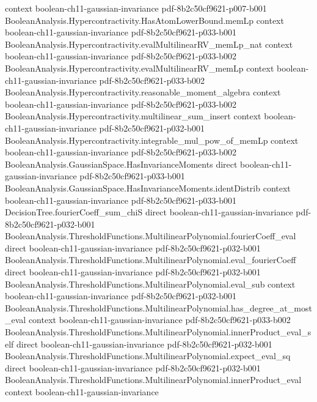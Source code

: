 \begin{theorem}
  {context}
  {boolean-ch11-gaussian-invariance}
  {pdf-8b2c50cf9621-p007-b001}
\proofstep
  {BooleanAnalysis.Hypercontractivity.HasAtomLowerBound.memLp}
  {context}
  {boolean-ch11-gaussian-invariance}
  {pdf-8b2c50cf9621-p033-b001}
\proofstep
  {BooleanAnalysis.Hypercontractivity.evalMultilinearRV_memLp_nat}
  {context}
  {boolean-ch11-gaussian-invariance}
  {pdf-8b2c50cf9621-p033-b002}
\proofstep
  {BooleanAnalysis.Hypercontractivity.evalMultilinearRV_memLp}
  {context}
  {boolean-ch11-gaussian-invariance}
  {pdf-8b2c50cf9621-p033-b002}
\proofstep
  {BooleanAnalysis.Hypercontractivity.reasonable_moment_algebra}
  {context}
  {boolean-ch11-gaussian-invariance}
  {pdf-8b2c50cf9621-p033-b002}
\proofstep
  {BooleanAnalysis.Hypercontractivity.multilinear_sum_insert}
  {context}
  {boolean-ch11-gaussian-invariance}
  {pdf-8b2c50cf9621-p032-b001}
\proofstep
  {BooleanAnalysis.Hypercontractivity.integrable_mul_pow_of_memLp}
  {context}
  {boolean-ch11-gaussian-invariance}
  {pdf-8b2c50cf9621-p033-b002}
\proofstep
  {BooleanAnalysis.GaussianSpace.HasInvarianceMoments}
  {direct}
  {boolean-ch11-gaussian-invariance}
  {pdf-8b2c50cf9621-p033-b001}
\proofstep
  {BooleanAnalysis.GaussianSpace.HasInvarianceMoments.identDistrib}
  {context}
  {boolean-ch11-gaussian-invariance}
  {pdf-8b2c50cf9621-p033-b001}
\proofstep
  {DecisionTree.fourierCoeff_sum_chiS}
  {direct}
  {boolean-ch11-gaussian-invariance}
  {pdf-8b2c50cf9621-p032-b001}
\proofstep
  {BooleanAnalysis.ThresholdFunctions.MultilinearPolynomial.fourierCoeff_eval}
  {direct}
  {boolean-ch11-gaussian-invariance}
  {pdf-8b2c50cf9621-p032-b001}
\proofstep
  {BooleanAnalysis.ThresholdFunctions.MultilinearPolynomial.eval_fourierCoeff}
  {direct}
  {boolean-ch11-gaussian-invariance}
  {pdf-8b2c50cf9621-p032-b001}
\proofstep
  {BooleanAnalysis.ThresholdFunctions.MultilinearPolynomial.eval_sub}
  {context}
  {boolean-ch11-gaussian-invariance}
  {pdf-8b2c50cf9621-p032-b001}
\proofstep
  {BooleanAnalysis.ThresholdFunctions.MultilinearPolynomial.has_degree_at_most_eval}
  {context}
  {boolean-ch11-gaussian-invariance}
  {pdf-8b2c50cf9621-p033-b002}
\proofstep
  {BooleanAnalysis.ThresholdFunctions.MultilinearPolynomial.innerProduct_eval_self}
  {direct}
  {boolean-ch11-gaussian-invariance}
  {pdf-8b2c50cf9621-p032-b001}
\proofstep
  {BooleanAnalysis.ThresholdFunctions.MultilinearPolynomial.expect_eval_sq}
  {direct}
  {boolean-ch11-gaussian-invariance}
  {pdf-8b2c50cf9621-p032-b001}
\proofstep
  {BooleanAnalysis.ThresholdFunctions.MultilinearPolynomial.innerProduct_eval}
  {context}
  {boolean-ch11-gaussian-invariance}

\end{theorem}
